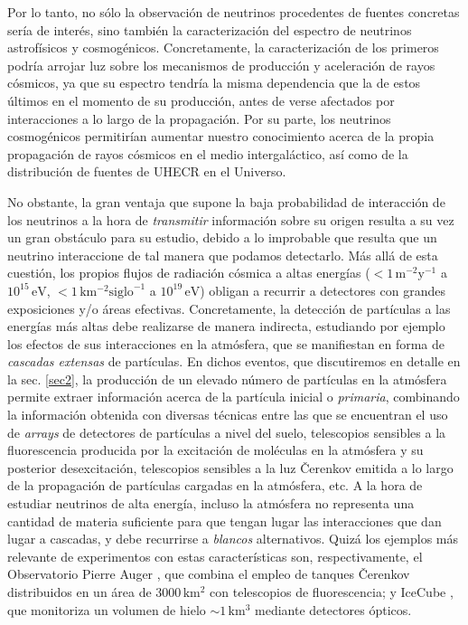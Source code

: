 \documentclass[12 pt, a4paper]{article} %
\numberwithin{equation}{section}
\numberwithin{figure}{section}
\numberwithin{table}{section}
\begin{document}
	Por lo tanto, no sólo la observación de neutrinos procedentes de fuentes concretas sería de interés, sino también la caracterización del espectro de neutrinos astrofísicos y cosmogénicos. Concretamente, la caracterización de los primeros podría arrojar luz sobre los mecanismos de producción y aceleración de rayos cósmicos, ya que su espectro tendría la misma dependencia que la de estos últimos en el momento de su producción, antes de verse afectados por interacciones a lo largo de la propagación. Por su parte, los neutrinos cosmogénicos permitirían aumentar nuestro conocimiento acerca de la propia propagación de rayos cósmicos en el medio intergaláctico, así como de la distribución de fuentes de UHECR en el Universo.
	
	No obstante, la gran ventaja que supone la baja probabilidad de interacción de los neutrinos a la hora de \textit{transmitir} información sobre su origen resulta a su vez un gran obstáculo para su estudio, debido a lo improbable que resulta que un neutrino interaccione de tal manera que podamos detectarlo. Más allá de esta cuestión, los propios flujos de radiación cósmica a altas energías ($<1\,\mathrm{m^{-2}y^{-1}}$ a $10^{15}\,\mathrm{eV}$, $<1\,\mathrm{km^{-2}\text{siglo}^{-1}}$ a $10^{19}\,\mathrm{eV}$) obligan a recurrir a detectores con grandes exposiciones y/o áreas efectivas. Concretamente, la detección de partículas a las energías más altas debe realizarse de manera indirecta, estudiando por ejemplo los efectos de sus interacciones en la atmósfera, que se manifiestan en forma de \textit{cascadas extensas} de partículas. En dichos eventos, que discutiremos en detalle en la sec. \ref{sec2}, la producción de un elevado número de partículas en la atmósfera permite extraer información acerca de la partícula inicial o \textit{primaria}, combinando la información obtenida con diversas técnicas entre las que se encuentran el uso de \textit{arrays} de detectores de partículas a nivel del suelo, telescopios sensibles a la fluorescencia producida por la excitación de moléculas en la atmósfera y su posterior desexcitación, telescopios sensibles a la luz \v{C}erenkov emitida a lo largo de la propagación de partículas cargadas en la atmósfera, etc. A la hora de estudiar neutrinos de alta energía, incluso la atmósfera no representa una cantidad de materia suficiente para que tengan lugar las interacciones que dan lugar a cascadas, y debe recurrirse a \textit{blancos} alternativos. Quizá los ejemplos más relevante de experimentos con estas características son, respectivamente, el Observatorio Pierre Auger \cite{pierre2015pierre}, que combina el empleo de tanques \v{C}erenkov distribuidos en un área de $3000\,\mathrm{km^2}$ con telescopios de fluorescencia; y IceCube \cite{halzen2010invited}, que monitoriza un volumen de hielo $\sim 1\,\mathrm{km^3}$ mediante detectores ópticos.
\end{document}

